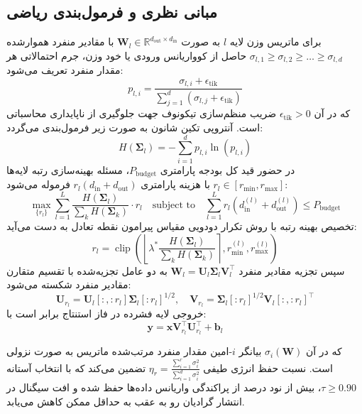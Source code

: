 \subsection{مبانی نظری و فرمول‌بندی ریاضی}
برای ماتریس وزن لایه $l$ به صورت $\mathbf{W}_l \in \mathbb{R}^{d_{\text{out}} \times d_{\text{in}}}$ با مقادیر منفرد هموارشده $\sigma_{l, 1} \ge \sigma_{l, 2} \ge \dots \ge \sigma_{l, d}$ حاصل از کوواریانس ورودی یا خود وزن، جرم احتمالاتی هر مقدار منفرد تعریف می‌شود:
\begin{equation}
p_{l, i} = \frac{\sigma_{l, i} + \epsilon_{\text{tik}}}{\sum_{j=1}^d (\sigma_{l, j} + \epsilon_{\text{tik}})}
\end{equation}
که در آن $\epsilon_{\text{tik}} > 0$ ضریب منظم‌سازی تیکونوف جهت جلوگیری از ناپایداری محاسباتی است. آنتروپی تکین شانون به صورت زیر فرمول‌بندی می‌گردد:
\begin{equation}
H(\mathbf{\Sigma}_l) = -\sum_{i=1}^d p_{l, i} \ln(p_{l, i})
\end{equation}
در حضور قید کل بودجه پارامتری $P_{\text{budget}}$، مسئله بهینه‌سازی رتبه لایه‌ها $r_l \in [r_{\min}, r_{\max}]$ با هزینه پارامتری $r_l (d_{\text{in}} + d_{\text{out}})$ فرموله می‌شود:
\begin{equation}
\max_{\{r_l\}} \sum_{l=1}^L \frac{H(\mathbf{\Sigma}_l)}{\sum_k H(\mathbf{\Sigma}_k)} \cdot r_l \quad \text{subject to} \quad \sum_{l=1}^L r_l (d_{\text{in}}^{(l)} + d_{\text{out}}^{(l)}) \le P_{\text{budget}}
\end{equation}
تخصیص بهینه رتبه با روش تکرار دودویی مقیاس پیرامون نقطه تعادل به دست می‌آید:
\begin{equation}
r_l = \operatorname{clip}\left(\left\lfloor \lambda^* \frac{H(\mathbf{\Sigma}_l)}{\sum_k H(\mathbf{\Sigma}_k)} \right\rceil, r_{\min}^{(l)}, r_{\max}^{(l)}\right)
\end{equation}
سپس تجزیه مقادیر منفرد $\mathbf{W}_l = \mathbf{U}_l \mathbf{\Sigma}_l \mathbf{V}_l^\top$ به دو عامل تجزیه‌شده با تقسیم متقارن مقادیر منفرد شکسته می‌شود:
\begin{equation}
\mathbf{U}_{r_l} = \mathbf{U}_l[:, :r_l] \mathbf{\Sigma}_l[:r_l]^{1/2}, \quad \mathbf{V}_{r_l} = \mathbf{\Sigma}_l[:r_l]^{1/2} \mathbf{V}_l[:, :r_l]^\top
\end{equation}
خروجی لایه فشرده در فاز استنتاج برابر است با:
\begin{equation}
\mathbf{y} = \mathbf{x} \mathbf{V}_{r_l}^\top \mathbf{U}_{r_l}^\top + \mathbf{b}_l
\end{equation}

که در آن $\sigma_i(\mathbf{W})$ بیانگر $i$-امین مقدار منفرد مرتب‌شده ماتریس به صورت نزولی است. نسبت حفظ انرژی طیفی $\eta_r = \frac{\sum_{i=1}^r \sigma_i^2}{\sum_{i=1}^{d} \sigma_i^2}$ تضمین می‌کند که با انتخاب آستانه $\tau \ge 0.90$، بیش از نود درصد از پراکندگی واریانس داده‌ها حفظ شده و افت سیگنال در انتشار گرادیان رو به عقب به حداقل ممکن کاهش می‌یابد.

